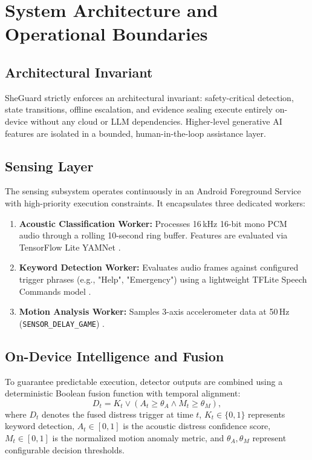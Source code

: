 \documentclass[conference]{IEEEtran}
\begin{document}
\section{System Architecture and Operational Boundaries}

\subsection{Architectural Invariant}
SheGuard strictly enforces an architectural invariant: safety-critical detection, state transitions, offline escalation, and evidence sealing execute entirely on-device without any cloud or LLM dependencies. Higher-level generative AI features are isolated in a bounded, human-in-the-loop assistance layer.

\subsection{Sensing Layer}
The sensing subsystem operates continuously in an Android Foreground Service with high-priority execution constraints. It encapsulates three dedicated workers:
\begin{enumerate}
    \item \textbf{Acoustic Classification Worker:} Processes 16\,kHz 16-bit mono PCM audio through a rolling 10-second ring buffer. Features are evaluated via TensorFlow Lite YAMNet \cite{yamnet_hub}.
    \item \textbf{Keyword Detection Worker:} Evaluates audio frames against configured trigger phrases (e.g., "Help", "Emergency") using a lightweight TFLite Speech Commands model \cite{warden2018}.
    \item \textbf{Motion Analysis Worker:} Samples 3-axis accelerometer data at 50\,Hz (\texttt{SENSOR\_DELAY\_GAME}) \cite{android_sensor}.
\end{enumerate}

\subsection{On-Device Intelligence and Fusion}
To guarantee predictable execution, detector outputs are combined using a deterministic Boolean fusion function with temporal alignment:
\begin{equation}
D_t = K_t \lor \left(A_t \ge \theta_A \land M_t \ge \theta_M\right),
\label{eq:fusion}
\end{equation}
where $D_t$ denotes the fused distress trigger at time $t$, $K_t \in \{0, 1\}$ represents keyword detection, $A_t \in [0, 1]$ is the acoustic distress confidence score, $M_t \in [0, 1]$ is the normalized motion anomaly metric, and $\theta_A, \theta_M$ represent configurable decision thresholds.
\end{document}
